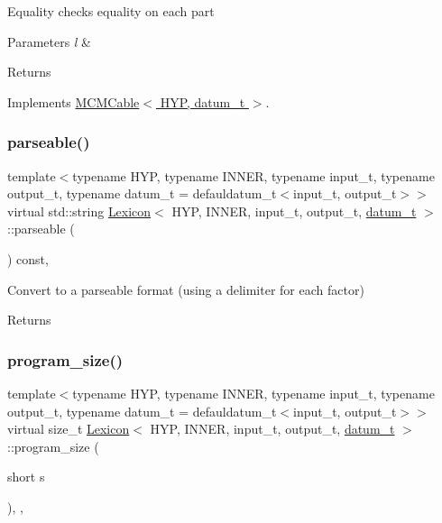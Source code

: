 Equality checks equality on each part 
\begin{DoxyParams}{Parameters}
{\em l} & \\
\hline
\end{DoxyParams}
\begin{DoxyReturn}{Returns}

\end{DoxyReturn}


Implements \hyperlink{class_m_c_m_cable_aa73001ec3bb0cf0c618281dfa998f2f1}{M\+C\+M\+Cable$<$ H\+Y\+P, datum\+\_\+t $>$}.

\mbox{\label{class_lexicon_a0ed99caee19dc82e57e80b290abd239a}} 
\subsubsection{\texorpdfstring{parseable()}{parseable()}}
{\footnotesize\ttfamily template$<$typename H\+YP, typename I\+N\+N\+ER, typename input\+\_\+t, typename output\+\_\+t, typename datum\+\_\+t = defauldatum\+\_\+t$<$input\+\_\+t, output\+\_\+t$>$$>$ \\
virtual std\+::string \hyperlink{class_lexicon}{Lexicon}$<$ H\+YP, I\+N\+N\+ER, input\+\_\+t, output\+\_\+t, \hyperlink{class_bayesable_a9f1a6c0cd7855550fa10b1a8f13a5867}{datum\+\_\+t} $>$\+::parseable (\begin{DoxyParamCaption}{ }\end{DoxyParamCaption}) const\hspace{0.3cm}{\ttfamily [inline]}, {\ttfamily [virtual]}}

Convert to a parseable format (using a delimiter for each factor) \begin{DoxyReturn}{Returns}

\end{DoxyReturn}
\mbox{\label{class_lexicon_a005225141f8a245fe33d8f0a58fd397a}} 
\subsubsection{\texorpdfstring{program\+\_\+size()}{program\_size()}}
{\footnotesize\ttfamily template$<$typename H\+YP, typename I\+N\+N\+ER, typename input\+\_\+t, typename output\+\_\+t, typename datum\+\_\+t = defauldatum\+\_\+t$<$input\+\_\+t, output\+\_\+t$>$$>$ \\
virtual size\+\_\+t \hyperlink{class_lexicon}{Lexicon}$<$ H\+YP, I\+N\+N\+ER, input\+\_\+t, output\+\_\+t, \hyperlink{class_bayesable_a9f1a6c0cd7855550fa10b1a8f13a5867}{datum\+\_\+t} $>$\+::program\+\_\+size (\begin{DoxyParamCaption}\item[{short}]{s }\end{DoxyParamCaption})\hspace{0.3cm}{\ttfamily [inline]}, {\ttfamily [override]}, {\ttfamily [virtual]}}

